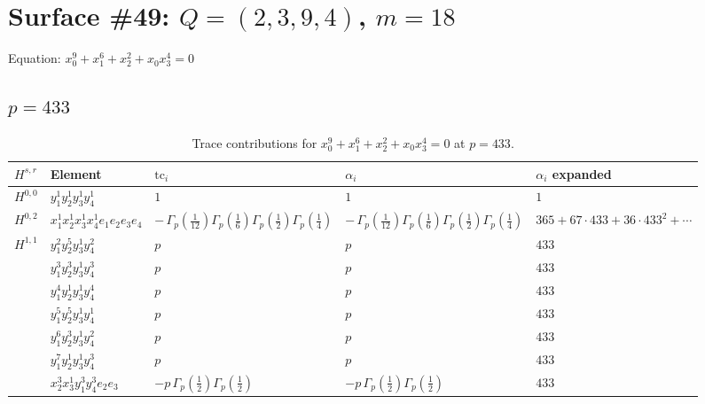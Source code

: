 \documentclass[11pt]{article}
\begin{document}
\newpage

\section*{Surface \#49: $Q=(2, 3, 9, 4)$, $m=18$}

Equation: $x_0^{9} + x_1^{6} + x_2^{2} + x_0 x_3^{4} = 0$

\subsection*{$p = 433$}

\begin{table}[ht]
\centering
\caption{Trace contributions for $x_0^{9} + x_1^{6} + x_2^{2} + x_0 x_3^{4} = 0$ at $p=433$.}\label{tab:deformed-49}
\renewcommand{\arraystretch}{1.1}
{\scriptsize
\begin{tabular}{@{}lllll@{}}
\toprule
$H^{s,r}$ & Element & $\mathrm{tc}_i$ & $\alpha_i$ & $\alpha_i$ expanded \\
\midrule
$H^{0,0}$ & $y_{1}^{1} y_{2}^{1} y_{3}^{1} y_{4}^{1}$ & $1$ & $1$ & $1$ \\
\midrule
$H^{0,2}$ & $x_{1}^{1} x_{2}^{1} x_{3}^{1} x_{4}^{1}  e_{1} e_{2} e_{3} e_{4}$ & $- \, \Gamma_p \left( \frac{1}{12} \right) \Gamma_p \left( \frac{1}{6} \right) \Gamma_p \left( \frac{1}{2} \right) \Gamma_p \left( \frac{1}{4} \right)$ & $- \, \Gamma_p \left( \frac{1}{12} \right) \Gamma_p \left( \frac{1}{6} \right) \Gamma_p \left( \frac{1}{2} \right) \Gamma_p \left( \frac{1}{4} \right)$ & $365{+}67{\cdot}433{+}36{\cdot}433^{2}{+}\cdots$ \\
\midrule
$H^{1,1}$ & $y_{1}^{2} y_{2}^{5} y_{3}^{1} y_{4}^{2}$ & $p \,$ & $p \,$ & $433$ \\
 & $y_{1}^{3} y_{2}^{3} y_{3}^{1} y_{4}^{3}$ & $p \,$ & $p \,$ & $433$ \\
 & $y_{1}^{4} y_{2}^{1} y_{3}^{1} y_{4}^{4}$ & $p \,$ & $p \,$ & $433$ \\
 & $y_{1}^{5} y_{2}^{5} y_{3}^{1} y_{4}^{1}$ & $p \,$ & $p \,$ & $433$ \\
 & $y_{1}^{6} y_{2}^{3} y_{3}^{1} y_{4}^{2}$ & $p \,$ & $p \,$ & $433$ \\
 & $y_{1}^{7} y_{2}^{1} y_{3}^{1} y_{4}^{3}$ & $p \,$ & $p \,$ & $433$ \\
 & $x_{2}^{3} x_{3}^{1} y_{1}^{3} y_{4}^{3} e_{2} e_{3}$ & $- p \, \Gamma_p \left( \frac{1}{2} \right) \Gamma_p \left( \frac{1}{2} \right)$ & $- p \, \Gamma_p \left( \frac{1}{2} \right) \Gamma_p \left( \frac{1}{2} \right)$ & $433$ \\

\end{tabular}}
\end{table}
\end{document}
